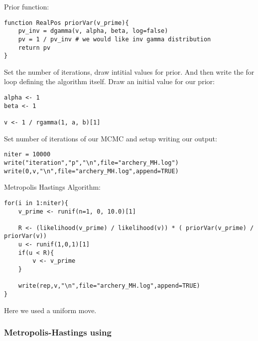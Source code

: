 Prior function: 

{\tt \begin{snugshade*}
 \begin{lstlisting}
function RealPos priorVar(v_prime){
	pv_inv = dgamma(v, alpha, beta, log=false)
	pv = 1 / pv_inv # we would like inv gamma distribution
	return pv
}
\end{lstlisting}
\end{snugshade*}}



Set the number of iterations, draw intitial values for prior. And then write the for loop defining the algorithm itself. 
Draw an initial value for our prior:

{\tt \begin{snugshade*}
 \begin{lstlisting}
alpha <- 1
beta <- 1

v <- 1 / rgamma(1, a, b)[1]
\end{lstlisting}
\end{snugshade*}}

Set number of iterations of our MCMC and setup writing our output:

{\tt \begin{snugshade*}
 \begin{lstlisting}
niter = 10000
write("iteration","p","\n",file="archery_MH.log")
write(0,v,"\n",file="archery_MH.log",append=TRUE)
\end{lstlisting}
\end{snugshade*}}


Metropolis Hastings Algorithm:

{\tt \begin{snugshade*}
 \begin{lstlisting}
for(i in 1:niter){
	v_prime <- runif(n=1, 0, 10.0)[1]
    
	R <- (likelihood(v_prime) / likelihood(v)) * ( priorVar(v_prime) / priorVar(v))
	u <- runif(1,0,1)[1]
	if(u < R){
		v <- v_prime
	}

	write(rep,v,"\n",file="archery_MH.log",append=TRUE)
}
\end{lstlisting}
\end{snugshade*}}


Here we used a uniform move. 

\subsubsection{Metropolis-Hastings using \RevBayes}

